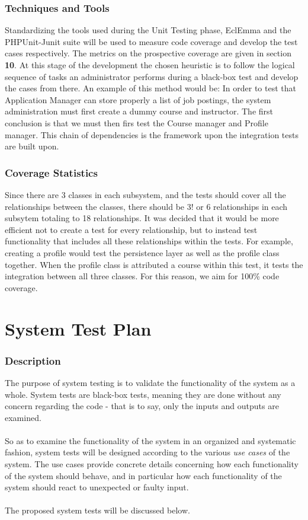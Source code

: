 \documentclass[12pt]{report}
\begin{document}
\section{Techniques and Tools}
Standardizing the tools used during the Unit Testing phase, EclEmma and the PHPUnit-Junit suite will be used to measure code coverage and develop the test cases respectively. The metrics on the prospective coverage are given in section \textbf{10}. At this stage of the development the chosen heuristic is to follow the logical sequence of tasks an administrator performs during a black-box test and develop the cases from there. An example of this method would be: In order to test that Application Manager can store properly a list of job postings, the system administration must first create a dummy course and instructor. The first conclusion is that we must then firs test the Course manager and Profile manager. This chain of dependencies is the framework upon the integration tests are built upon.

\section{Coverage Statistics}
Since there are 3 classes in each subsystem, and the tests should cover all the relationships
between the classes, there should be 3! or 6 relationships in each subsytem totaling to 18
relationships. It was decided that it would be more efficient not to create a test for every
relationship, but to instead test functionality that includes all these relationships within the
tests. For example, creating a profile would test the persistence layer as well as the profile class
together. When the profile class is attributed a course within this test, it tests the integration
between all three classes. For this reason, we aim for 100\% code coverage.
\part{System Test Plan}
\section{Description}
The purpose of system testing is to validate the functionality of the system as a whole. System
tests are black-box tests, meaning they are done without any concern regarding the code - that is to
say, only the inputs and outputs are examined.\\\\
So as to examine the functionality of the system in an organized and systematic fashion, system
tests will be designed according to the various \textit{use cases} of the system. The use cases
provide concrete details concerning how each functionality of the system should behave, and in
particular how each functionality of the system should react to unexpected or faulty input.\\\\
The proposed system tests will be discussed below.
\end{document}
